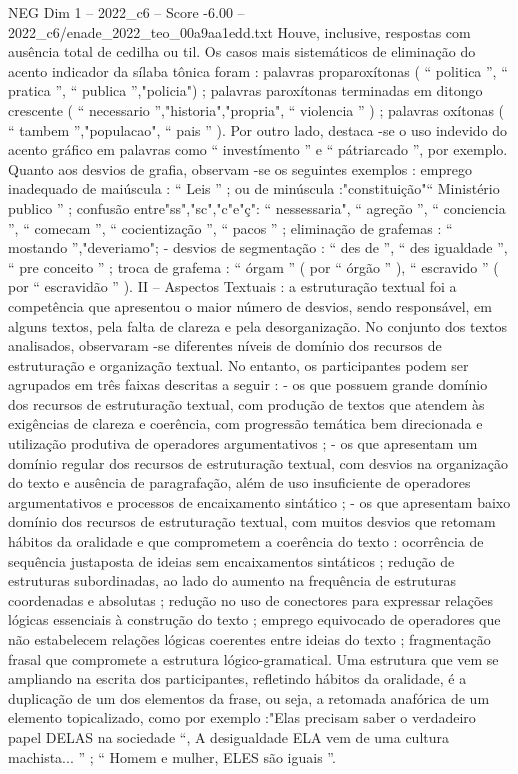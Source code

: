 \begin{textsample}{NEG Dim 1 – 2022\_c6 – Score -6.00 – 2022\_c6/enade\_2022\_teo\_00a9aa1edd.txt}
Houve, inclusive, respostas com ausência total de cedilha ou til.
Os casos mais sistemáticos de eliminação do acento indicador da sílaba tônica foram : palavras proparoxítonas ( “ politica ”, “ pratica ”, “ publica ”,"policia") ; palavras paroxítonas terminadas em ditongo crescente ( “ necessario ”,"historia","propria", “ violencia ” ) ; palavras oxítonas ( “ tambem ”,"populacao", “ pais ” ).
Por outro lado, destaca -se o uso indevido do acento gráfico em palavras como “ investímento ” e “ pátriarcado ”, por exemplo.
Quanto aos desvios de grafia, observam -se os seguintes exemplos : emprego inadequado de maiúscula : “ Leis ” ; ou de minúscula :"constituição"“ Ministério publico ” ; confusão entre"ss","sc","c"e"ç": “ nessessaria", “ agreção ”, “ conciencia ”, “ comecam ”, “ cocientização ”, “ pacos ” ; eliminação de grafemas : “ mostando ”,"deveriamo"; - desvios de segmentação : “ des de ”, “ des igualdade ”, “ pre conceito ” ; troca de grafema : “ órgam ” ( por “ órgão ” ), “ escravido ” ( por “ escravidão ” ).
II – Aspectos Textuais : a estruturação textual foi a competência que apresentou o maior número de desvios, sendo responsável, em alguns textos, pela falta de clareza e pela desorganização.
No conjunto dos textos analisados, observaram -se diferentes níveis de domínio dos recursos de estruturação e organização textual.
No entanto, os participantes podem ser agrupados em três faixas descritas a seguir : - os que possuem grande domínio dos recursos de estruturação textual, com produção de textos que atendem às exigências de clareza e coerência, com progressão temática bem direcionada e utilização produtiva de operadores argumentativos ; - os que apresentam um domínio regular dos recursos de estruturação textual, com desvios na organização do texto e ausência de paragrafação, além de uso insuficiente de operadores argumentativos e processos de encaixamento sintático ; - os que apresentam baixo domínio dos recursos de estruturação textual, com muitos desvios que retomam hábitos da oralidade e que comprometem a coerência do texto : ocorrência de sequência justaposta de ideias sem encaixamentos sintáticos ; redução de estruturas subordinadas, ao lado do aumento na frequência de estruturas coordenadas e absolutas ; redução no uso de conectores para expressar relações lógicas essenciais à construção do texto ; emprego equivocado de operadores que não estabelecem relações lógicas coerentes entre ideias do texto ; fragmentação frasal que compromete a estrutura lógico-gramatical.
Uma estrutura que vem se ampliando na escrita dos participantes, refletindo hábitos da oralidade, é a duplicação de um dos elementos da frase, ou seja, a retomada anafórica de um elemento topicalizado, como por exemplo :"Elas precisam saber o verdadeiro papel DELAS na sociedade “, A desigualdade ELA vem de uma cultura machista... ” ; “ Homem e mulher, ELES são iguais ”.

\end{textsample}

